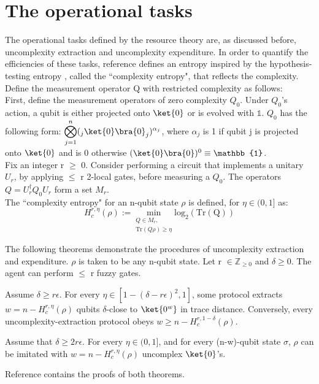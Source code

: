\section{The operational tasks}
The operational tasks defined by the resource theory are, as discussed before, uncomplexity extraction and uncomplexity expenditure. In order to quantify the efficiencies of these tasks, reference \cite{halpern2021resource} defines an entropy inspired by the hypothesis-testing entropy \cite{wang2012one,datta2013smooth}, called the ``complexity entropy", that reflects the complexity. 
\\
Define the measurement operator Q with restricted complexity as follows:
\\
First, define the measurement operators of zero complexity $Q_{0}$. Under $Q_{0}$'s action, a qubit is either projected onto $\ket{0}$ or is evolved with $\mathbb{1}$. $Q_{0}$ has the following form: $\displaystyle\bigotimes_{j=1}^{n}(_{j}\ket{0}\bra{0}_{j})^{\alpha_j}$, where $\alpha_{j}$ is 1 if qubit j is projected onto $\ket{0}$ and is 0 otherwise $(\ket{0}\bra{0})^{0} \equiv \mathbb{1}$. 
\\
Fix an integer r $\ge$ 0. Consider performing a circuit that implements a unitary $U_{r}$, by applying $\le$ r 2-local gates, before measuring a $Q_{0}$. The operators $Q = U_{r}^{\dag}Q_{0}U_{r}$ form a set $M_{r}$.
\\
The ``complexity entropy" for an n-qubit state $\rho$ is defined, for $\eta \in (0,1]$ as: 
$$ H^{r,\eta}_c (\rho) := \underset{{\substack{Q \in M_r, \\ \mathrm{Tr}(Q\rho)\ge \eta}}}{\mathrm{min}} {\mathrm{log_2(Tr(Q))}}$$



The following theorems demonstrate the procedures of uncomplexity extraction and expenditure. $\rho$ is taken to be any n-qubit state. Let r $\in \mathbb{Z}_{\ge 0}$ and $\delta \ge 0$. The agent can perform $\le$ r fuzzy gates. 
\\
\begin{theorem} 
Assume $\delta \ge r\epsilon$. For every $\eta \in [1 - (\delta -r\epsilon)^2, 1]$, some protocol extracts $w = n - H^{r,\eta}_c (\rho)$ qubits $\delta$-close to $\ket{0^w}$ in trace distance. Conversely, every uncomplexity-extraction protocol obeys $w \ge n - H^{r,1-\delta}_c (\rho)$.
\end{theorem}

\begin{theorem} 
Assume that $\delta \ge 2r\epsilon$. For every $\eta \in (0,1]$, and for every (n-w)-qubit state $\sigma$, $\rho$ can be imitated with $w = n - H^{r,\eta}_c (\rho)$ uncomplex $\ket{0}$'s.
\end{theorem}
Reference \cite{halpern2021resource} contains the proofs of both theorems.
